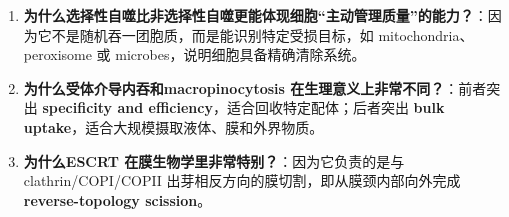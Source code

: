 \documentclass[12pt,fontset=none]{ctexart}
\begin{document}
\begin{enumerate}
\item \textbf{为什么选择性自噬比非选择性自噬更能体现细胞“主动管理质量”的能力？}：因为它不是随机吞一团胞质，而是能识别特定受损目标，如 mitochondria、peroxisome 或 microbes，说明细胞具备精确清除系统。

\item \textbf{为什么受体介导内吞和macropinocytosis 在生理意义上非常不同？}：前者突出 \textbf{specificity and efficiency}，适合回收特定配体；后者突出 \textbf{bulk uptake}，适合大规模摄取液体、膜和外界物质。

\item \textbf{为什么ESCRT 在膜生物学里非常特别？}：因为它负责的是与 clathrin/COPI/COPII 出芽相反方向的膜切割，即从膜颈内部向外完成 \textbf{reverse-topology scission}。

\end{enumerate}
\end{document}
